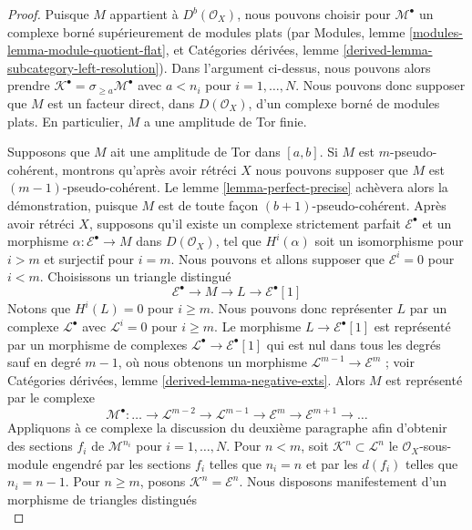 \begin{proof}
\medskip\noindent
Puisque $M$ appartient à $D^b(\mathcal{O}_X)$, nous pouvons choisir pour $\mathcal{M}^\bullet$ un complexe borné supérieurement de modules plats (par Modules, lemme \ref{modules-lemma-module-quotient-flat}, et Catégories dérivées, lemme \ref{derived-lemma-subcategory-left-resolution}). Dans l'argument ci-dessus, nous pouvons alors prendre $\mathcal{K}^\bullet = \sigma_{\geq a}\mathcal{M}^\bullet$ avec $a < n_i$ pour $i = 1, \ldots, N$. Nous pouvons donc supposer que $M$ est un facteur direct, dans $D(\mathcal{O}_X)$, d'un complexe borné de modules plats. En particulier, $M$ a une amplitude de Tor finie.

\medskip\noindent

Supposons que $M$ ait une amplitude de Tor dans $[a, b]$. Si $M$ est $m$-pseudo-cohérent, montrons qu'après avoir rétréci $X$ nous pouvons supposer que $M$ est
$(m - 1)$-pseudo-cohérent. Le lemme \ref{lemma-perfect-precise} achèvera alors la démonstration, puisque
$M$ est de toute façon $(b + 1)$-pseudo-cohérent. Après avoir rétréci $X$, supposons qu'il existe un complexe strictement parfait $\mathcal{E}^\bullet$ et un morphisme $\alpha : \mathcal{E}^\bullet \to M$
dans $D(\mathcal{O}_X)$, tel que $H^i(\alpha)$ soit un isomorphisme pour
$i > m$ et surjectif pour $i = m$. Nous pouvons et allons supposer que $\mathcal{E}^i = 0$ pour $i < m$. Choisissons un triangle distingué
$$
\mathcal{E}^\bullet \to M \to L \to \mathcal{E}^\bullet[1]
$$
Notons que $H^i(L) = 0$ pour $i \geq m$. Nous pouvons donc représenter
$L$ par un complexe $\mathcal{L}^\bullet$ avec $\mathcal{L}^i = 0$
pour $i \geq m$. Le morphisme $L \to \mathcal{E}^\bullet[1]$
est représenté par un morphisme de complexes
$\mathcal{L}^\bullet \to \mathcal{E}^\bullet[1]$
qui est nul dans tous les degrés sauf en degré $m - 1$,
où nous obtenons un morphisme $\mathcal{L}^{m - 1} \to \mathcal{E}^m$ ; voir Catégories dérivées, lemme \ref{derived-lemma-negative-exts}. Alors $M$ est représenté par le complexe
$$
\mathcal{M}^\bullet :
\ldots \to
\mathcal{L}^{m - 2} \to
\mathcal{L}^{m - 1} \to
\mathcal{E}^m \to
\mathcal{E}^{m + 1} \to \ldots
$$
Appliquons à ce complexe la discussion du deuxième paragraphe afin d'obtenir des sections $f_i$ de $\mathcal{M}^{n_i}$ pour $i = 1, \ldots, N$. Pour $n < m$, soit $\mathcal{K}^n \subset \mathcal{L}^n$
le $\mathcal{O}_X$-sous-module engendré par les sections
$f_i$ telles que $n_i = n$ et par les $d(f_i)$ telles que $n_i = n - 1$. Pour $n \geq m$, posons $\mathcal{K}^n = \mathcal{E}^n$. Nous disposons manifestement d'un morphisme de triangles distingués
$$
$$
\end{proof}

